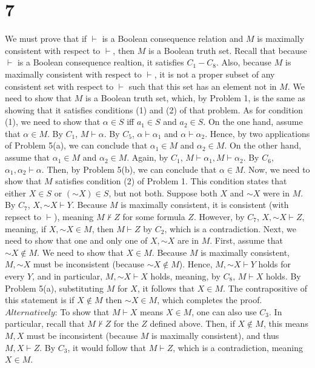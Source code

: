 \documentclass{article}
\newcommand*{\oldneg}{\mathord{\sim}}
\theoremstyle{definition}
\begin{document}
\section*{7}
We must prove that if $\vdash$ is a Boolean consequence relation and $M$ is maximally consistent with respect to $\vdash$, then $M$ is a Boolean truth 
set. Recall that because $\vdash$ is a Boolean consequence realtion, it satisfies $C_1-C_8$. Also, because $M$ is maximally consistent with respect to 
$\vdash$, it is not a proper subset of any consistent set with respect to $\vdash$ such that this set has an element not in $M$. We need to show that 
$M$ is a Boolean truth set, which, by Problem 1, is the same as showing that it satisfies conditions (1) and (2) of that problem. As for condition (1), 
we need to show that $\alpha\in S$ iff $a_1\in S$ and $a_2\in S$. On the one hand, assume that $\alpha\in M$. By $C_1$, $M\vdash\alpha$. By $C_5$, 
$\alpha\vdash\alpha_1$ and $\alpha\vdash\alpha_2$. Hence, by two applications of Problem 5(a), we can conclude that $\alpha_1\in M$ and $\alpha_2\in M$. 
On the other hand, assume that $\alpha_1\in M$ and $\alpha_2\in M$. Again, by $C_1$, $M\vdash\alpha_1,M\vdash\alpha_2$. 
By $C_6$, $\alpha_1,\alpha_2\vdash\alpha$. 
Then, by Problem 5(b), we can conclude that $\alpha\in M$.\newline
Now, we need to show that $M$ satisfies condition (2) of Problem 1. This condition states that either $X\in S$ or $(\oldneg X)\in S$, but not both. 
Suppose both $X$ and $\oldneg X$ were in $M$. By $C_7$, $X,\oldneg X\vdash Y$. Because $M$ is maximally consistent, it is consistent (with repsect to 
$\vdash$), meaning $M\nvdash Z$ for some formula $Z$. However, by $C_7$, $X,\oldneg X\vdash Z$, meaning, if $X,\oldneg X\in M$, then 
$M\vdash Z$ by $C_2$, which is a contradiction.\newline
Next, we need to show that one and only one of $X,\oldneg X$ are in $M$. First, assume that $\oldneg X\notin M$. We need to show that $X\in M$. 
Because $M$ is maximally consistent, $M,\oldneg X$ must be inconsistent (because $\oldneg X\notin M$). Hence, $M,\oldneg X\vdash Y$ holds for 
every $Y$, and in particular, $M,\oldneg X\vdash X$ holds, meaning, by $C_8$, $M\vdash X$ holds. By Problem 5(a), substituting $M$ for $X$, 
it follows that $X\in M$. The contrapositive of this statement is if $X\notin M$ then $\oldneg X\in M$, which completes the proof.\newline
$Alternatively$: To show that $M\vdash X$ means $X\in M$, one can also use $C_3$. In particular, recall that $M\nvdash Z$ for the $Z$ defined above. 
Then, if $X\notin M$, this means $M,X$ must be inconsistent (because $M$ is maximally consistent), and thus $M,X\vdash Z$. By $C_3$, it would follow 
that $M\vdash Z$, which is a contradiction, meaning $X\in M$. 
\end{document}
